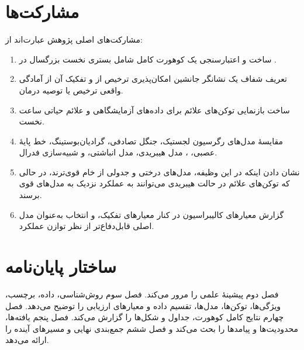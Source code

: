 \section{مشارکت‌ها}
مشارکت‌های اصلی پژوهش عبارت‌اند از:
\begin{enumerate}
\item ساخت و اعتبارسنجی یک کوهورت کامل  شامل  بستری نخست بزرگسال در .
\item تعریف شفاف یک نشانگر جانشین امکان‌پذیری ترخیص از  و تفکیک آن از آمادگی واقعی ترخیص یا توصیه درمان.
\item ساخت بازنمایی توکن‌های علائم برای داده‌های آزمایشگاهی و علائم حیاتی  ساعت نخست.
\item مقایسۀ مدل‌های رگرسیون لجستیک، جنگل تصادفی، گرادیان‌بوستینگ، خط پایۀ عصبی، ، مدل هیبریدی، مدل انباشتی، و شبیه‌سازی فدرال.
\item نشان دادن اینکه در این وظیفه، مدل‌های درختی و جدولی از  خام قوی‌ترند، در حالی که توکن‌های علائم در حالت هیبریدی می‌توانند به عملکرد نزدیک به مدل‌های قوی برسند.
\item گزارش معیارهای کالیبراسیون در کنار معیارهای تفکیک، و انتخاب  به‌عنوان مدل اصلی قابل‌دفاع‌تر از نظر توازن عملکرد.
\end{enumerate}

\section{ساختار پایان‌نامه}
فصل دوم پیشینۀ علمی را مرور می‌کند. فصل سوم روش‌شناسی، داده، برچسب، ویژگی‌ها، توکن‌ها، مدل‌ها، تقسیم داده و معیارهای ارزیابی را توضیح می‌دهد. فصل چهارم نتایج کامل کوهورت، جداول و شکل‌ها را گزارش می‌کند. فصل پنجم یافته‌ها، محدودیت‌ها و پیامدها را بحث می‌کند و فصل ششم جمع‌بندی نهایی و مسیرهای آینده را ارائه می‌دهد.
